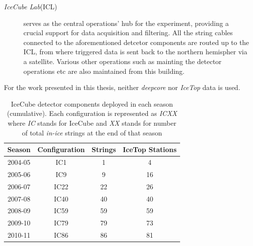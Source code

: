 \begin{description}
	\item[\emph{IceCube Lab}(ICL)] serves as the central operations' hub for the experiment, providing a crucial support for data acquisition and filtering. All the string cables connected to the aforementioned detcetor components are routed up to the ICL, from where triggered data is sent back to the northern hemispher via a satellite. Various other operations such as mainting the detector operations etc are also maintained from this building. 
	\end{description}

For the work presented in this thesis, neither \emph{deepcore} nor \emph{IceTop} data is used.
\begin{table}
    \caption{IceCube detector components deployed in each season (cumulative). Each configuration is represented as \emph{ICXX} where \emph{IC} stands for IceCube and \emph{XX} stands for number of total \emph{in-ice} strings at the end of that season}
    \begin{tabular}{cccc}
        \hline
        \hline
        Season & Configuration & Strings & IceTop Stations\\
        \hline
        2004-05 & IC1 & 1 & 4\\ 
        2005-06 & IC9 & 9 & 16\\ 
        2006-07 & IC22 & 22 & 26\\ 
        2007-08 & IC40 & 40 & 40\\ 
        2008-09 & IC59 & 59 & 59\\ 
        2009-10 & IC79 & 79 & 73\\ 
        2010-11 & IC86 & 86 & 81\\  
        \hline
        \hline
    \end{tabular}
    \end{table}


